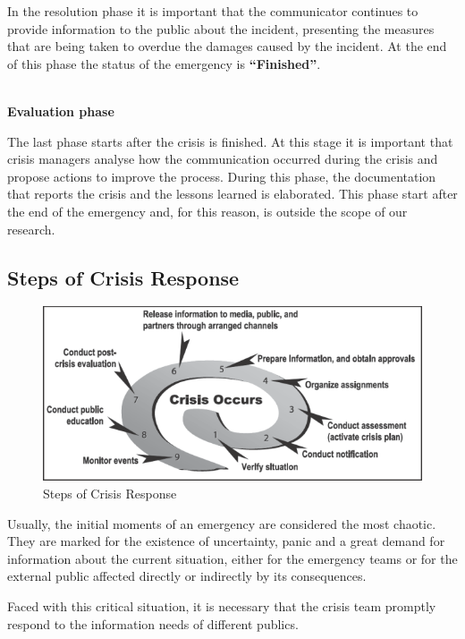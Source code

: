   In the resolution phase it is important that the communicator continues to provide information to the public about the incident, presenting the measures that are being taken to overdue the damages caused by the incident. At the end of this phase the status of the emergency is \textbf{“Finished”}.
  
  
  \textbf{\\Evaluation phase\\}
  
  The last phase starts after the crisis is finished. At this stage it is important that crisis managers analyse how the communication occurred during the crisis and propose actions to improve the process. During this phase, the documentation that reports the crisis and the lessons learned is elaborated. This phase start after the end of the emergency and, for this reason, is outside the scope of our research. 
  
\subsection{Steps of Crisis Response}

\begin{figure}[htb]
\begin{center}
  \includegraphics[scale=0.6]{images/CrisisSteps}
\caption{Steps of Crisis Response \cite{centers2006crisis}}
\label{fig:nineSteps}
\end{center}
\end{figure}

Usually, the initial moments of an emergency are considered the most chaotic. They are marked for the existence of uncertainty, panic and a great demand for information about the current situation, either for the emergency teams or for the external public affected directly or indirectly by its consequences. 

Faced with this critical situation, it is necessary that the crisis team promptly respond to the information needs of different publics. 


